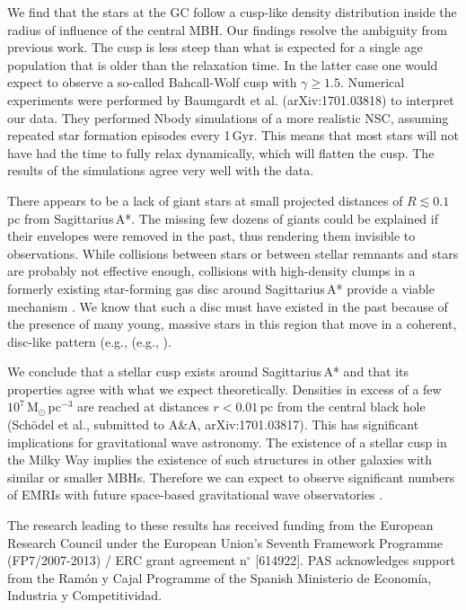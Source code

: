 \documentclass[a4paper]{jpconf}
\begin{document}
We find that the stars at the GC follow a cusp-like density
distribution inside the radius of influence of the central MBH. Our
findings resolve the ambiguity from previous work. The cusp is less
steep than what is expected for a single age population that is older
than the relaxation time. In the latter case one would expect to
observe a so-called Bahcall-Wolf cusp with $\gamma\geq1.5$. Numerical
experiments were performed by Baumgardt et
al. (arXiv:1701.03818) to interpret our data. They performed Nbody simulations of a more
realistic NSC, assuming repeated star formation episodes every
1\,Gyr. This means that most stars will not have had the time to fully
relax dynamically, which will flatten the cusp. The results of the
simulations agree very well with the data. 

There appears to be a lack of giant stars at small projected distances
of $R\lesssim0.1$\,pc from Sagittarius\,A*. The missing few dozens of
giants could be explained if their envelopes were removed in the past,
thus rendering them invisible to observations. While collisions between
stars or between stellar remnants and stars are probably not effective
enough, collisions with high-density clumps in a formerly existing
star-forming gas disc around Sagittarius\,A* provide a viable
mechanism \cite{Amaro-Seoane:2014fk}. We know that such a disc must
have existed in the past because of the presence of many young,
massive stars in this region that move in a coherent, disc-like
pattern (e.g., (e.g.,
\cite{Beloborodov:2006ff,Lu:2009bl,Genzel:2010fk}).

We conclude that a stellar cusp exists around Sagittarius\,A* and that
its properties agree with what we expect theoretically. Densities in
excess of a few $10^{7}$\,M$_{\odot}$\,pc$^{-3}$ are reached at
distances $r<0.01$\,pc from the central black hole (Sch\"odel et al.,
submitted to A\&A, arXiv:1701.03817).  This has significant
implications for gravitational wave astronomy. The existence of a
stellar cusp in the Milky Way implies the existence of such structures
in other galaxies with similar or smaller MBHs. Therefore we can
expect to observe significant numbers of EMRIs with future space-based
gravitational wave observatories
\cite{Hopman:2005dn,Amaro-Seoane:2012ty,Amaro-Seoane:2012ys,Amaro-Seoane:2013zr}.



\ack 

The research leading to these results has received funding from the
European Research Council under the European Union's Seventh Framework
Programme (FP7/2007-2013) / ERC grant agreement n$^{\circ}$
[614922]. PAS acknowledges support from the Ram{\'o}n y Cajal
Programme of the Spanish Ministerio de Economía, Industria y
Competitividad.


\end{document}
